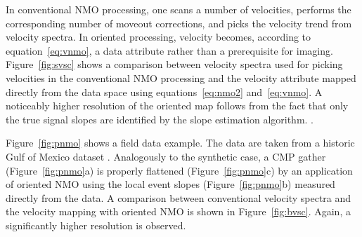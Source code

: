 
In conventional NMO processing, one scans a number of velocities,
performs the corresponding number of moveout corrections, and picks
the velocity trend from velocity spectra. In oriented processing,
velocity becomes, according to equation~\ref{eq:vnmo}, a data
attribute rather than a prerequisite for
imaging. Figure~\ref{fig:svsc} shows a comparison between velocity
spectra used for picking velocities in the conventional NMO processing
and the velocity attribute mapped directly from the data space using
equations~\ref{eq:nmo2} and~\ref{eq:vnmo}. A noticeably higher
resolution of the oriented map follows from the fact that only the
true signal slopes are identified by the slope estimation algorithm.
.



Figure~\ref{fig:pnmo} shows a field data example. The data are taken
from a historic Gulf of Mexico dataset \cite[]{bei}. Analogously to
the synthetic case, a CMP gather (Figure~\ref{fig:pnmo}a) is properly
flattened (Figure~\ref{fig:pnmo}c) by an application of oriented NMO
using the local event slopes (Figure~\ref{fig:pnmo}b) measured
directly from the data. A comparison between conventional velocity
spectra and the velocity mapping with oriented NMO is shown in
Figure~\ref{fig:bvsc}. Again, a significantly higher resolution is
observed.



